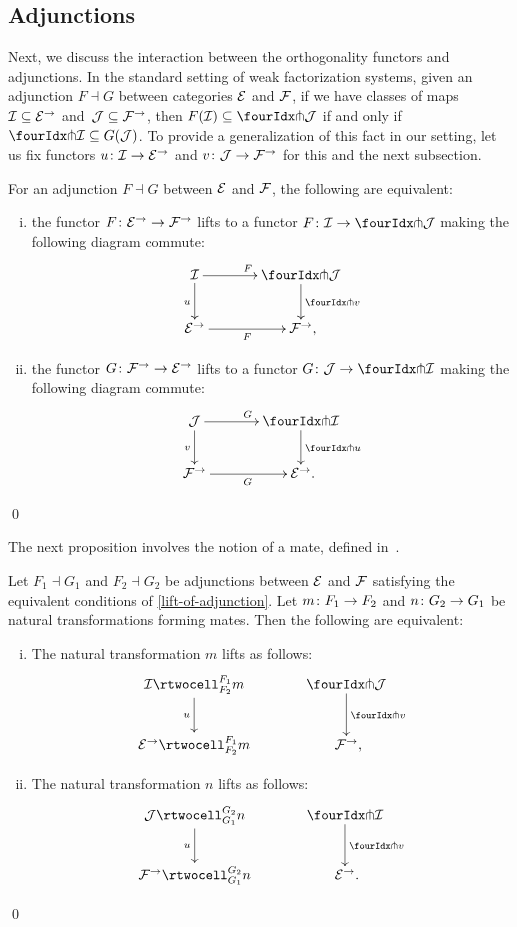 \documentclass[reqno,10pt,a4paper,oneside,draft]{amsart}
\begin{document}
\subsection*{Adjunctions}

Next, we discuss the interaction between the orthogonality functors and adjunctions.
In the standard setting of weak factorization systems, given an adjunction $F \dashv G$ between categories $\cal{E}$ and $\cal{F}$, if we have classes of maps $\cal{I} \subseteq \catE^\to$ and~$\cal{J} \subseteq \cal{F}^\to$, then $F(\cal{I}) \subseteq \liftl{\cal{J}}$ if and only if $\liftr{\cal{I}} \subseteq G(\cal{J})$.
To provide a generalization of this fact in our setting, let us fix functors $u \co \cal{I} \to \catE^\to$ and $v \co \cal{J} \to \cal{F}^\to$ for this and the next subsection.

\begin{proposition} \label{lift-of-adjunction}
For an adjunction $F \dashv G$ between $\cal{E}$ and $\cal{F}$, the following are equivalent:
\begin{enumerate}[(i)]
\item the functor $F \co \catE^\to \to \cal{F}^\to$ lifts to a functor $F \co \cal{I} \to \liftl{\cal{J}}$ making the following diagram commute:
\[
\xymatrix@C=1.2cm{
  \cal{I}
  \ar[r]^{F}
  \ar[d]_{u}
&
  \liftl{\cal{J}}
  \ar[d]^{\liftl{v}}
\\
  \catE^\to
  \ar[r]_-{F}
&
  \cal{F}^\to
\rlap{,}}
\]
\item the functor $G \co \cal{F}^\to \to \catE^\to$ lifts to a functor $G \co \cal{J} \to \liftr{\cal{I}}$ making the following diagram commute:
\[
\xymatrix@C=1.2cm{
  \cal{J}
    \ar[d]_{v}
\ar[r]^{G}
&
  \liftr{\cal{I}}
  \ar[d]^{\liftr{u}}
\\
  \cal{F}^\to
   \ar[r]_{G}
&
  \catE^\to
\rlap{.}  }
\]
\end{enumerate}
\qed
\end{proposition}

The next proposition involves the notion of a mate, defined in~\cite{kelly-street}.

\begin{proposition} \label{lift-of-mates}
Let $F_1 \dashv G_1$ and $F_2 \dashv G_2$ be adjunctions between $\cal{E}$ and $\cal{F}$ satisfying the equivalent conditions of \cref{lift-of-adjunction}.
Let $m \co F_1 \to F_2$ and $n \co G_2 \to G_1$ be natural transformations forming mates.
Then the following are equivalent:
\begin{enumerate}[(i)]
\item
The natural transformation $m$ lifts as follows:
\[
\xymatrix@C=1.2cm{
  \cal{I}
  \rtwocell_{F_2}^{F_1}{m}
  \ar[d]_{u}
&
  \liftl{\cal{J}}
  \ar[d]^{\liftl{v}}
\\
  \catE^\to
  \rtwocell_{F_2}^{F_1}{m}
&
  \cal{F}^\to
\rlap{,}}
\]
\item
The natural transformation $n$ lifts as follows:
\[
\xymatrix@C=1.2cm{
  \cal{J}
  \rtwocell_{G_1}^{G_2}{n}
  \ar[d]_{u}
&
  \liftr{\cal{I}}
  \ar[d]^{\liftl{v}}
\\
  \cal{F}^\to
  \rtwocell_{G_1}^{G_2}{n}
&
  \cal{E}^\to
\rlap{.}}
\]
\end{enumerate}
\qed
\end{proposition}
\end{document}
